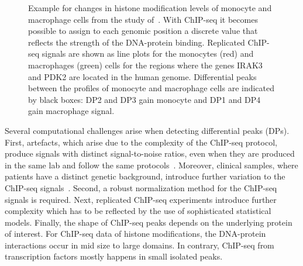 \begin{figure}[t]
\begin{center}
\end{center}
\caption[Example for changes in histone modification levels]{Example for changes in histone modification levels of monocyte and macrophage cells from the study of~\cite{Stunnenberg2014}. 
With ChIP-seq it becomes possible to assign to each genomic position a discrete value that reflects the strength of the DNA-protein binding.
Replicated ChIP-seq signals are shown as line plots for the monocytes (red) and macrophages (green) cells for the regions where the genes IRAK3 and PDK2 are located in the human genome.
Differential peaks between the profiles of monocyte and macrophage cells are indicated by black boxes: DP2 and DP3 gain monocyte and DP1 and DP4 gain macrophage signal.}
\label{fig_intro}
\end{figure}

Several computational challenges arise when detecting differential peaks (DPs).
First, artefacts, which arise due to the complexity of the ChIP-seq protocol, produce signals with distinct signal-to-noise ratios, even when they are produced in the same lab and follow the same protocols~\citep{Furey2012,Meyer2014}. 
Moreover, clinical samples, where patients have a distinct genetic background, introduce further variation to the ChIP-seq signals~\citep{ashoor2013}.
Second, a robust normalization method for the ChIP-seq signals is required.
Next, replicated ChIP-seq experiments introduce further complexity which has to be reflected by the use of sophisticated statistical models.
Finally, the shape of ChIP-seq peaks depends on the underlying protein of interest.
For ChIP-seq data of histone modifications, the DNA-protein interactions occur in mid size to large domains.
In contrary, ChIP-seq from transcription factors mostly happens in small isolated peaks.

